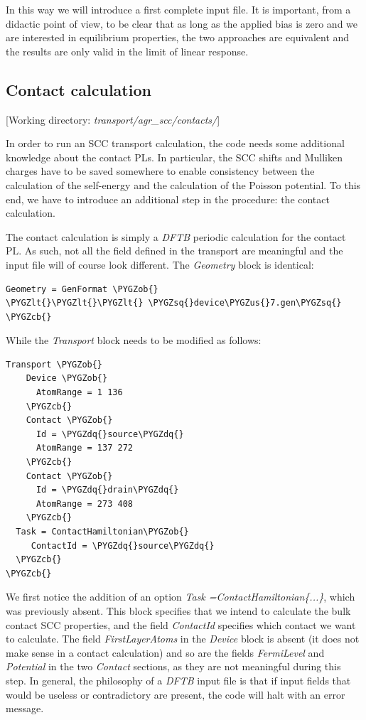 \documentclass[a4paper,11pt,english]{sphinxmanual}
\def\PYGZus{\char`\_}
\def\PYGZob{\char`\{}
\def\PYGZcb{\char`\}}
\def\PYGZlt{\char`\<}
\def\PYGZsq{\char`\'}
\def\PYGZdq{\char`\"}
\renewcommand\PYGZsq{\textquotesingle}
\begin{document}
{{In this way we will introduce a first complete input file. It is
important, from a didactic point of view, to be clear that as long as
the applied bias is zero and we are interested in equilibrium
properties, the two approaches are equivalent and the results are only
valid in the limit of linear response.


\subsection{Contact calculation}
\label{transport:contact-calculation}
{[}Working directory: \emph{transport/agr\_scc/contacts/}{]}

In order to run an SCC transport calculation, the code needs some
additional knowledge about the contact PLs. In particular, the SCC
shifts and Mulliken charges have to be saved somewhere to enable
consistency between the calculation of the self-energy and the
calculation of the Poisson potential. To this end, we have to
introduce an additional step in the procedure: the contact
calculation.

The contact calculation is simply a \emph{DFTB} periodic calculation for
the contact PL. As such, not all the field defined in the transport
are meaningful and the input file will of course look different. The
\emph{Geometry} block is identical:

\begin{Verbatim}[commandchars=\\\{\}]
Geometry = GenFormat \PYGZob{}
\PYGZlt{}\PYGZlt{}\PYGZlt{} \PYGZsq{}device\PYGZus{}7.gen\PYGZsq{}
\PYGZcb{}
\end{Verbatim}

While the \emph{Transport} block needs to be modified as follows:

\begin{Verbatim}[commandchars=\\\{\}]
Transport \PYGZob{}
    Device \PYGZob{}
      AtomRange = 1 136
    \PYGZcb{}
    Contact \PYGZob{}
      Id = \PYGZdq{}source\PYGZdq{}
      AtomRange = 137 272
    \PYGZcb{}
    Contact \PYGZob{}
      Id = \PYGZdq{}drain\PYGZdq{}
      AtomRange = 273 408
    \PYGZcb{}
  Task = ContactHamiltonian\PYGZob{}
     ContactId = \PYGZdq{}source\PYGZdq{}
  \PYGZcb{}
\PYGZcb{}
\end{Verbatim}

We first notice the addition of an option \emph{Task
=ContactHamiltonian\{...\}}, which was previously absent. This block
specifies that we intend to calculate the bulk contact SCC properties,
and the field \emph{ContactId} specifies which contact we want to
calculate. The field \emph{FirstLayerAtoms} in the \emph{Device} block is absent
(it does not make sense in a contact calculation) and so are the
fields \emph{FermiLevel} and \emph{Potential} in the two \emph{Contact} sections, as
they are not meaningful during this step. In general, the philosophy
of a \emph{DFTB} input file is that if input fields that would be useless
or contradictory are present, the code will halt with an error
message.

}}
\end{document}
